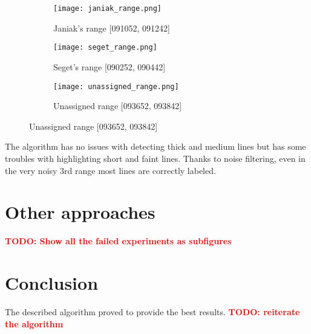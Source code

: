 \documentclass{article}
\newcommand\todo[1]{\textcolor{red}{\bf TODO: #1}}
\begin{document}
\begin{figure}[htbp]
    \centering
    \begin{subfigure}{0.45\textwidth}
        \centering
        \texttt{[image: janiak\_range.png]}
        \caption{Janiak's range [091052, 091242]}
        \label{fig:sub1}
    \end{subfigure}
    \hfill
    \begin{subfigure}{0.45\textwidth}
        \centering
        \texttt{[image: seget\_range.png]}
        \caption{Seget's range [090252, 090442]}
        \label{fig:sub2}
    \end{subfigure}

    \begin{subfigure}{0.45\textwidth}
        \centering
        \texttt{[image: unassigned\_range.png]}
        \caption{Unassigned range [093652, 093842]}
        \label{fig:sub3}
    \end{subfigure}

\end{figure}

The algorithm has no issues with detecting thick and medium lines but has some troubles with highlighting short and faint lines. Thanks to noise filtering, even in the very noisy 3rd range most lines are correctly labeled.

\newpage
\section{Other approaches}
\todo{Show all the failed experiments as subfigures}

\section{Conclusion}
The described algorithm proved to provide the best results. \todo{reiterate the algorithm}

% 
% 
\end{document}
